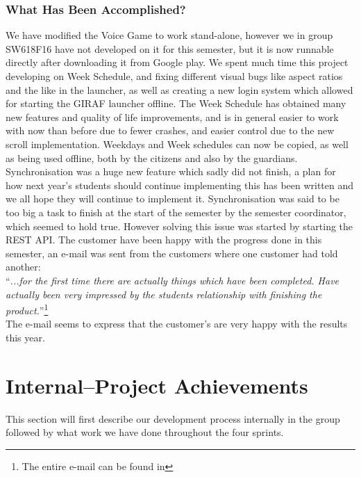 \subsubsection*{What Has Been Accomplished?}
We have modified the Voice Game to work stand-alone, however we in group SW618F16 have not developed on it for this semester, but it is now runnable directly after downloading it from Google play.
We spent much time this project developing on Week Schedule, and fixing different visual bugs like aspect ratios and the like in the launcher, as well as creating a new login system which allowed for starting the GIRAF launcher offline.
The Week Schedule has obtained many new features and quality of life improvements, and is in general easier to work with now than before due to fewer crashes, and easier control due to the new scroll implementation.
Weekdays and Week schedules can now be copied, as well as being used offline, both by the citizens and also by the guardians.
Synchronisation was a huge new feature which sadly did not finish, a plan for how next year's students should continue implementing this has been written and we all hope they will continue to implement it.
Synchronisation was said to be too big a task to finish at the start of the semester by the semester coordinator, which seemed to hold true.
However solving this issue was started by starting the REST API.
The customer have been happy with the progress done in this semester, an e-mail was sent from the customers where one customer had told another:\\
\enquote{\textit{...for the first time there are actually things which have been completed. Have actually been very impressed by the students relationship with finishing the product.}}\footnote{The entire e-mail can be found in }
\\
The e-mail seems to express that the customer's are very happy with the results this year.

\section{Internal--Project Achievements}
This section will first describe our development process internally in the group followed by what work we have done throughout the four sprints.

